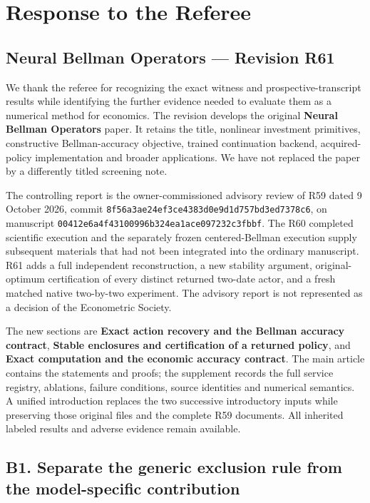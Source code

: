\hypertarget{response-to-the-referee}{%
\section{Response to the Referee}\label{response-to-the-referee}}

\hypertarget{neural-bellman-operators-revision-r61}{%
\subsection{Neural Bellman Operators --- Revision
R61}\label{neural-bellman-operators-revision-r61}}

We thank the referee for recognizing the exact witness and
prospective-transcript results while identifying the further evidence
needed to evaluate them as a numerical method for economics. The
revision develops the original \textbf{Neural Bellman Operators} paper.
It retains the title, nonlinear investment primitives, constructive
Bellman-accuracy objective, trained continuation backend,
acquired-policy implementation and broader applications. We have not
replaced the paper by a differently titled screening note.

The controlling report is the owner-commissioned advisory review of R59
dated 9 October 2026, commit
\texttt{8f56a3ae24ef3ce4383d0e9d1d757bd3ed7378c6}, on manuscript
\texttt{00412e6a4f43100996b324ea1ace097232c3fbbf}. The R60 completed
scientific execution and the separately frozen centered-Bellman
execution supply subsequent materials that had not been integrated into
the ordinary manuscript. R61 adds a full independent reconstruction, a
new stability argument, original-optimum certification of every distinct
returned two-date actor, and a fresh matched native two-by-two
experiment. The advisory report is not represented as a decision of the
Econometric Society.

The new sections are \textbf{Exact action recovery and the Bellman
accuracy contract}, \textbf{Stable enclosures and certification of a
returned policy}, and \textbf{Exact computation and the economic
accuracy contract}. The main article contains the statements and proofs;
the supplement records the full service registry, ablations, failure
conditions, source identities and numerical semantics. A unified
introduction replaces the two successive introductory inputs while
preserving those original files and the complete R59 documents. All
inherited labeled results and adverse evidence remain available.

\hypertarget{b1.-separate-the-generic-exclusion-rule-from-the-model-specific-contribution}{%
\subsection{B1. Separate the generic exclusion rule from the
model-specific
contribution}\label{b1.-separate-the-generic-exclusion-rule-from-the-model-specific-contribution}}


